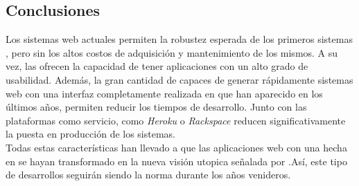 \subsection{Conclusiones}
\label{subsec:history:conclusions}

Los sistemas web actuales permiten la robustez esperada de los primeros sistemas
\mainframe, pero sin los altos costos de adquisición y mantenimiento de los 
mismos. A su vez, las \rias ofrecen la capacidad de tener aplicaciones con un 
alto grado de usabilidad. Además, la gran cantidad de \frameworks capaces de 
generar rápidamente sistemas web con una interfaz completamente 
realizada en \htmlv que han aparecido en los últimos años, permiten reducir los 
tiempos de desarrollo. Junto con las plataformas como servicio, como 
\emph{Heroku} o \emph{Rackspace} reducen significativamente la puesta en 
producción de los sistemas.\\
Todas estas características han llevado a que las aplicaciones web con una 
\viewtier hecha en \htmlv se hayan transformado en la nueva visión utopica 
señalada por \citeauthor{Elliot:2008:BOOK}.Así, este tipo de desarrollos 
seguirán siendo la norma durante los años venideros.
